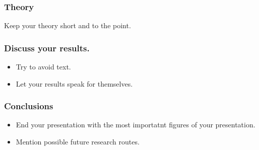 \documentclass[aspectratio=169]{beamer}
\begin{document}
\begin{frame}
\frametitle{Theory}
    Keep your theory short and to the point.
\end{frame}

\begin{frame}
\frametitle{Discuss your results.}
    \begin{itemize}
      \item Try to avoid text.
      \item Let your results speak for themselves.
    \end{itemize}
    
\end{frame}


\begin{frame}
\frametitle{Conclusions}
\begin{itemize}
  \item End your presentation with the most importatnt figures of your presentation.
  \item Mention possible future research routes.
\end{itemize}
\end{frame}
\end{document}
